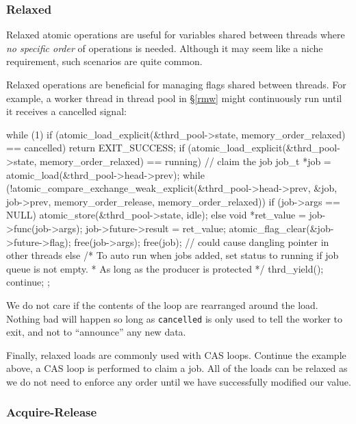 \documentclass[fontsize=10pt, oneside]{scrartcl}
\newcommand{\secref}[1]{\hyperref[#1]{\textsc{\S}\ref*{#1}}}
\begin{document}
\subsubsection{Relaxed}
Relaxed atomic operations are useful for variables shared between threads where \emph{no specific order} of operations is needed.
Although it may seem like a niche requirement, such scenarios are quite common.

Relaxed operations are beneficial for managing flags shared between threads.
For example, a worker thread in thread pool in \secref{rmw} might continuously run until it receives a cancelled signal:
\begin{cppcode}
while (1) {
    if (atomic_load_explicit(&thrd_pool->state, memory_order_relaxed) == cancelled)
        return EXIT_SUCCESS;
    if (atomic_load_explicit(&thrd_pool->state, memory_order_relaxed) == running) {
        // claim the job
        job_t *job = atomic_load(&thrd_pool->head->prev);
        while (!atomic_compare_exchange_weak_explicit(&thrd_pool->head->prev, &job,
                                               job->prev, memory_order_release, 
                                               memory_order_relaxed)) {
        }
        if (job->args == NULL) {
            atomic_store(&thrd_pool->state, idle);
        } else {
            void *ret_value = job->func(job->args);
            job->future->result = ret_value;
            atomic_flag_clear(&job->future->flag);
            free(job->args);
            free(job); // could cause dangling pointer in other threads
        }
    } else {
        /* To auto run when jobs added, set status to running if job queue is not empty.
         * As long as the producer is protected */
        thrd_yield();
        continue;
    }
};
\end{cppcode}
We do not care if the contents of the loop are rearranged around the load.
Nothing bad will happen so long as \texttt{cancelled} is only used to tell the worker to exit, and not to ``announce'' any new data.

Finally, relaxed loads are commonly used with \textsc{CAS} loops.
Continue the example above,
a \textsc{CAS} loop is performed to claim a job.
All of the loads can be relaxed as we do not need to enforce any order until we have successfully modified our value.

\subsubsection{Acquire-Release}
\end{document}
